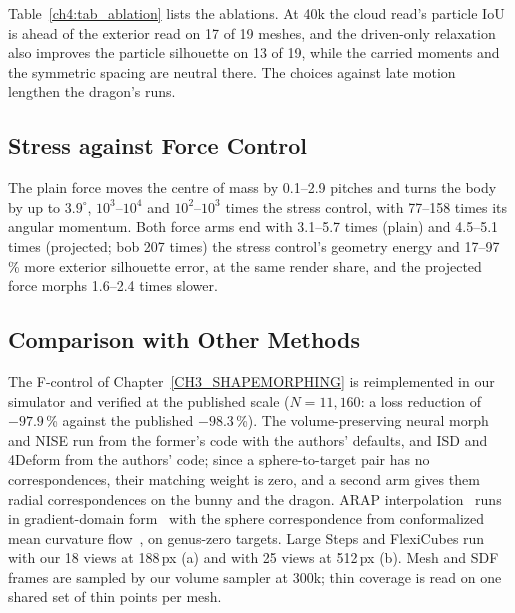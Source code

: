 Table~\ref{ch4:tab_ablation} lists the ablations. At 40k the cloud read's particle IoU is ahead of the exterior read on 17 of 19
meshes, and the driven-only relaxation also improves the particle silhouette on 13 of 19, while the carried moments and the
symmetric spacing are neutral there. The choices against late motion lengthen the dragon's runs.

\subsection{Stress against Force Control}
The plain force moves the centre of mass by 0.1--2.9 pitches and turns the body by up to $3.9^\circ$, $10^3$--$10^4$ and
$10^2$--$10^3$ times the stress control, with 77--158 times its angular momentum. Both force arms end with 3.1--5.7 times
(plain) and 4.5--5.1 times (projected; bob 207 times) the stress control's geometry energy and 17--97\,\% more exterior
silhouette error, at the same render share, and the projected force morphs 1.6--2.4 times slower.

\subsection{Comparison with Other Methods}
\label{app:ch4_comparison}
The F-control of Chapter~\ref{CH3_SHAPEMORPHING} is reimplemented in our simulator and verified at the published scale
($N=11{,}160$: a loss reduction of $-97.9$\,\% against the published $-98.3$\,\%). The volume-preserving neural morph and NISE
run from the former's code with the authors' defaults, and ISD and 4Deform from the authors' code; since a sphere-to-target
pair has no correspondences, their matching weight is zero, and a second arm gives them radial correspondences on the bunny and
the dragon. ARAP interpolation~\citep{alexa2000arap} runs in gradient-domain form~\citep{sumner2004deftransfer,xu2005poisson} with
the sphere correspondence from conformalized mean curvature flow~\citep{kazhdan2012cmcf}, on genus-zero targets. Large Steps and
FlexiCubes run with our 18 views at 188\,px (a) and with 25 views at 512\,px (b). Mesh and SDF frames are sampled by our volume
sampler at 300k; thin coverage is read on one shared set of thin points per mesh.

